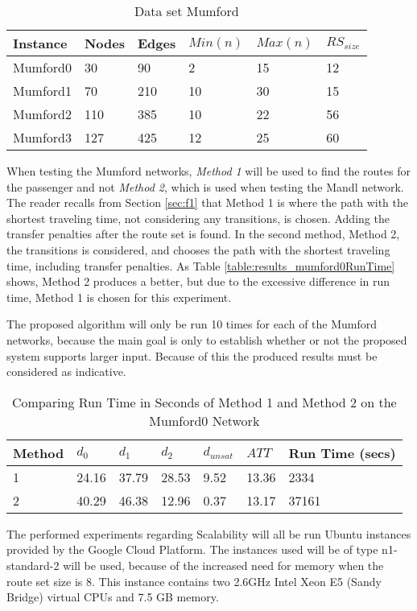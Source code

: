 \begin{table}[H]
	\centering
	\begin{tabular}{|l|l|l|l|l|l|}
    	\hline
    	Instance & Nodes&Edges & $Min(n)$ & $Max(n)$ & $RS_{size}$\\
    	\hline
   	    Mumford0 & 30&90 & 2&15 & 12 \\
   	    Mumford1 & 70&210 & 10&30 & 15 \\
   	    Mumford2 & 110&385 & 10&22 & 56 \\
   	    Mumford3 & 127&425 & 12&25 & 60 \\
   	    \hline
    \end{tabular}
    \caption{Data set Mumford}
    \label{table:dataSet_mumford}
\end{table}

When testing the Mumford networks, \textit{Method 1} will be used to find the routes for the passenger and not \textit{Method 2}, which is used when testing the Mandl network. The reader recalls from Section \vref{sec:f1} that Method 1 is where the path with the shortest traveling time, not considering any transitions, is chosen. Adding the transfer penalties after the route set is found. In the second method, Method 2, the transitions is considered, and chooses the path with the shortest traveling time, including transfer penalties. As Table \vref{table:results_mumford0RunTime} shows, Method 2 produces a better, but due to the excessive difference in run time, Method 1 is chosen for this experiment. 

The proposed algorithm will only be run 10 times for each of the Mumford networks, because the main goal is only to establish whether or not the proposed system supports larger input. Because of this the produced results must be considered as indicative. 

\begin{table}[H]
    \centering
    \begin{tabular}{|l|l|l|l|l|l|l|}
        \hline
        Method & $d_0$ & $d_1$ & $d_2$ & $d_{unsat}$ & $ATT$ & Run Time (secs) \\
        \hline
        1 & 24.16 & 37.79 & 28.53 & 9.52 & 13.36 & 2334 \\
        2 & 40.29 & 46.38 & 12.96 & 0.37 & 13.17 & 37161 \\
        \hline
    \end{tabular}
    \caption{Comparing Run Time in Seconds of Method 1 and Method 2 on the Mumford0 Network}
    \label{table:results_mumford0RunTime}
\end{table}

The performed experiments regarding Scalability will all be run Ubuntu instances provided by the Google Cloud Platform. The instances used will be of type n1-standard-2 will be used, because of the increased need for memory when the route set size is 8. This instance contains two 2.6GHz Intel Xeon E5 (Sandy Bridge) virtual CPUs and 7.5 GB memory\cite{website:google}.

